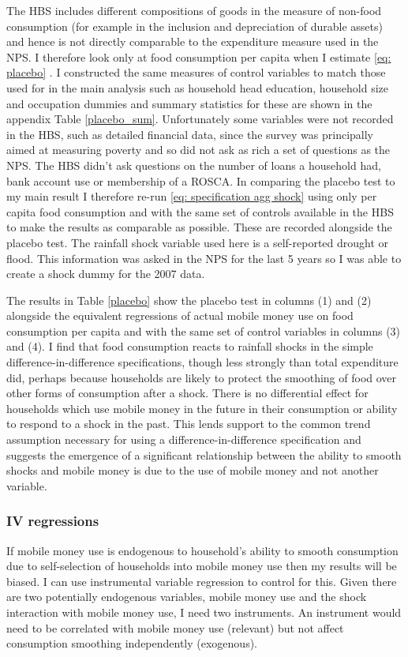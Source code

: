 The HBS includes different compositions of goods in the measure of non-food consumption (for example in the inclusion and depreciation of durable assets) and hence is not directly comparable to the expenditure measure used in the NPS. I therefore look only at food consumption per capita when I estimate \eqref{eq: placebo} . I constructed the same measures of control variables to match those used for in the main analysis such as household head education, household size and occupation dummies and summary statistics for these are shown in the appendix Table \ref{placebo_sum}. Unfortunately some variables were not recorded in the HBS, such as detailed financial data, since the survey was principally aimed at measuring poverty and so did not ask as rich a set of questions as the NPS. The HBS didn't ask questions on the number of loans a household had, bank account use or membership of a ROSCA. In comparing the placebo test to my main result I therefore re-run \eqref{eq: specification agg shock} using only per capita food consumption and with the same set of controls available in the HBS to make the results as comparable as possible. These are recorded alongside the placebo test. The rainfall shock variable used here is a self-reported drought or flood. This information was asked in the NPS for the last 5 years so I was able to create a shock dummy for the 2007 data. 

The results in Table \ref{placebo} show the placebo test in columns (1) and (2) alongside the equivalent regressions of actual mobile money use on food consumption per capita and with the same set of control variables in columns (3) and (4). I find that food consumption reacts to rainfall shocks in the simple difference-in-difference specifications, though less strongly than total expenditure did, perhaps because households are likely to protect the smoothing of food over other forms of consumption after a shock. There is no differential effect for households which use mobile money in the future in their consumption or ability to respond to a shock in the past. This lends support to the common trend assumption necessary for using a difference-in-difference specification and suggests the emergence of a significant relationship between the ability to smooth shocks and mobile money is due to the use of mobile money and not another variable.   

\subsubsection{IV regressions}
If mobile money use is endogenous to household's ability to smooth consumption due to self-selection of households into mobile money use then my results will be biased. I can use instrumental variable regression to control for this. Given there are two potentially endogenous variables, mobile money use and the shock interaction with mobile money use, I need two instruments. An instrument would need to be correlated with mobile money use (relevant) but not affect consumption smoothing independently (exogenous). 

